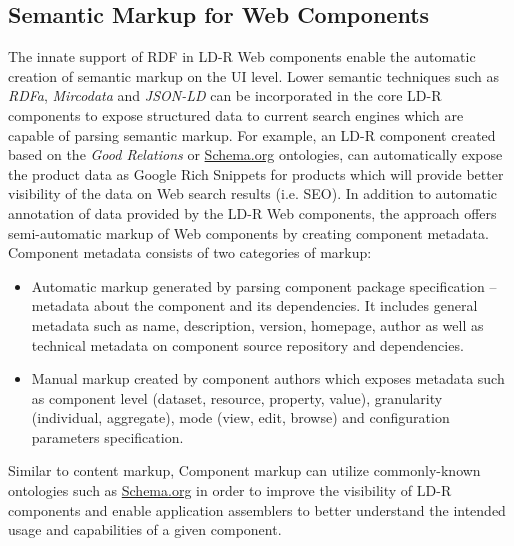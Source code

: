 \documentclass{llncs}
\begin{document}
\subsection{Semantic Markup for Web Components}
\label{sec:markup}
The innate support of RDF in LD-R Web components enable the automatic creation of semantic markup on the UI level.
Lower semantic techniques such as \emph{RDFa}, \emph{Mircodata} and \emph{JSON-LD} can be incorporated in the core LD-R components to expose structured data to current search engines which are capable of parsing semantic markup.
For example, an LD-R component created based on the \emph{Good Relations} or \url{Schema.org} ontologies, can automatically expose the product data as Google Rich Snippets for products which will provide better visibility of the data on Web search results (i.e. SEO).
In addition to automatic annotation of data provided by the LD-R Web components, the approach offers semi-automatic markup of Web components by creating component metadata.
Component metadata consists of two categories of markup:
\begin{itemize}
\small
\item Automatic markup generated by parsing component package specification -- metadata about the component and its dependencies. It includes general metadata such as name, description, version, homepage, author as well as technical metadata on component source repository and dependencies.

\item Manual markup created by component authors which exposes metadata such as component level (dataset, resource, property, value), granularity (individual, aggregate), mode (view, edit, browse) and configuration parameters specification.

\end{itemize}

Similar to content markup, Component markup can utilize commonly-known ontologies such as \url{Schema.org} in order to improve the visibility of LD-R components and enable application assemblers to better understand the intended usage and capabilities of a given component.
\end{document}
